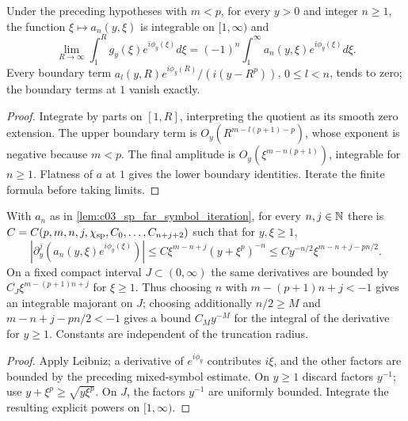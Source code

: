 \begin{lemma}
  \label{lem:c03_sp_far_limit_identity}
  Under the preceding hypotheses with $m<p$, for every $y>0$ and integer $n\ge1$,
  the function $\xi\mapsto a_n(y,\xi)$ is integrable on $[1,\infty)$ and
  \[
    \lim_{R\to\infty}\int_1^R g_y(\xi)e^{i\phi_y(\xi)}d\xi
        =(-1)^n\int_1^\infty a_n(y,\xi)e^{i\phi_y(\xi)}d\xi.
  \]
  Every boundary term $a_l(y,R)e^{i\phi_y(R)}/(i(y-R^p))$, $0\le l<n$, tends to zero;
  the boundary terms at $1$ vanish exactly.
\end{lemma}
\begin{proof}
  Integrate by parts on $[1,R]$, interpreting the quotient as its smooth zero extension.
  The upper boundary term is $O_y(R^{m-l(p+1)-p})$, whose exponent is negative because $m<p$.
  The final amplitude is $O_y(\xi^{m-n(p+1)})$, integrable for $n\ge1$.
  Flatness of $a$ at $1$ gives the lower boundary identities. Iterate the finite formula before taking limits.
\end{proof}

\begin{lemma}
  \label{lem:c03_sp_far_domination}
  With $a_n$ as in \cref{lem:c03_sp_far_symbol_iteration}, for every $n,j\in\mathbb{N}$ there is
  $C=C(p,m,n,j,\chi_{\rm sp},C_0,\ldots,C_{n+j+2})$ such that for $y,\xi\ge1$,
  \[
    |\partial_y^j(a_n(y,\xi)e^{i\phi_y(\xi)})|
      \le C\xi^{m-n+j}(y+\xi^p)^{-n}
      \le C y^{-n/2}\xi^{m-n+j-pn/2}.
  \]
  On a fixed compact interval $J\subset(0,\infty)$ the same derivatives are bounded by
  $C_J\xi^{m-(p+1)n+j}$ for $\xi\ge1$.
  Thus choosing $n$ with $m-(p+1)n+j<-1$ gives an integrable majorant on $J$;
  choosing additionally $n/2\ge M$ and $m-n+j-pn/2<-1$ gives a bound $C_M y^{-M}$
  for the integral of the derivative for $y\ge1$. Constants are independent of the truncation radius.
\end{lemma}
\begin{proof}
  Apply Leibniz; a derivative of $e^{i\phi_y}$ contributes $i\xi$, and the other factors
  are bounded by the preceding mixed-symbol estimate. On $y\ge1$ discard factors $y^{-1}$;
  use $y+\xi^p\ge\sqrt{y\xi^p}$. On $J$, the factors $y^{-1}$ are uniformly bounded.
  Integrate the resulting explicit powers on $[1,\infty)$.
\end{proof}


